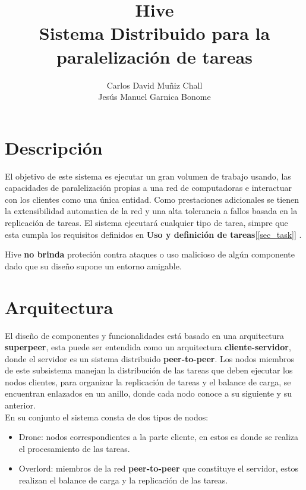 \documentclass[a4paper,10pt]{article}
\title{\textbf{Hive}\\ Sistema Distribuido para la paralelización de tareas}
\author{Carlos David Muñiz Chall\\Jesús Manuel Garnica Bonome}
\date{}
\begin{document}
	\maketitle

	\section{Descripción}
		
		El objetivo de este sistema es ejecutar un gran volumen de trabajo usando, las capacidades de paralelización propias a una red de computadoras e interactuar con los clientes como una única entidad. Como prestaciones adicionales se tienen la extensibilidad automatica de la red y una alta tolerancia a fallos basada en la replicación de tareas.
		El sistema ejecutará cualquier tipo de tarea, simpre que esta cumpla los requisitos definidos en \textbf{Uso y definición de tareas}[\ref{sec_task}] .
		
		Hive \textbf{no brinda} proteción contra ataques o uso malicioso de algún componente dado que su diseño supone un entorno amigable.
		
	\section{Arquitectura}
		El diseño de componentes y funcionalidades está basado en una arquitectura \textbf{superpeer}\cite{Tanenbaum}, esta puede ser entendida como un arquitectura \textbf{cliente-servidor}, donde el servidor es un sistema distribuido \textbf{peer-to-peer}. Los nodos miembros de este subsistema manejan la distribución de las tareas que deben ejecutar los nodos clientes, para organizar la replicación de tareas y el balance de carga, se encuentran enlazados en un anillo, donde cada nodo conoce a su siguiente y su anterior.\\		
					
		En su conjunto el sistema consta de dos tipos de nodos:	
		\begin{itemize}
			\item Drone: nodos correspondientes a la parte cliente, en estos es donde se realiza el procesamiento de las tareas.
			
			\item Overlord: miembros de la red \textbf{peer-to-peer} que constituye el servidor, estos realizan el balance de carga y la replicación de las tareas.			
		\end{itemize}
		
\end{document}
